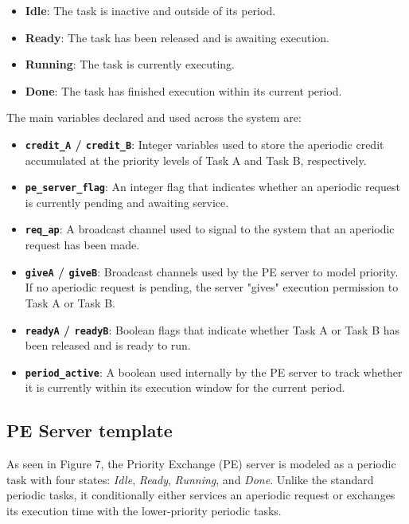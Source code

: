 \documentclass[conference]{IEEEtran}
\begin{document}
\begin{itemize}
    \item \textbf{Idle}: The task is inactive and outside of its period.
    \item \textbf{Ready}: The task has been released and is awaiting execution.
    \item \textbf{Running}: The task is currently executing.
    \item \textbf{Done}: The task has finished execution within its current period.
\end{itemize}

The main variables declared and used across the system are:
\begin{itemize}
    \item \textbf{\texttt{credit\_A} / \texttt{credit\_B}}: Integer variables used to store the aperiodic credit accumulated at the priority levels of Task A and Task B, respectively.
    \item \textbf{\texttt{pe\_server\_flag}}: An integer flag that indicates whether an aperiodic request is currently pending and awaiting service.
    \item \textbf{\texttt{req\_ap}}: A broadcast channel used to signal to the system that an aperiodic request has been made.
    \item \textbf{\texttt{giveA} / \texttt{giveB}}: Broadcast channels used by the PE server to model priority. If no aperiodic request is pending, the server "gives" execution permission to Task A or Task B.
    \item \textbf{\texttt{readyA} / \texttt{readyB}}: Boolean flags that indicate whether Task A or Task B has been released and is ready to run.
    \item \textbf{\texttt{period\_active}}: A boolean used internally by the PE server to track whether it is currently within its execution window for the current period.
\end{itemize}

\subsection{PE Server template}
As seen in Figure 7, the Priority Exchange (PE) server is modeled as a periodic task with four states: \textit{Idle}, \textit{Ready}, \textit{Running}, and \textit{Done}. Unlike the standard periodic tasks, it conditionally either services an aperiodic request or exchanges its execution time with the lower-priority periodic tasks.
\end{document}
